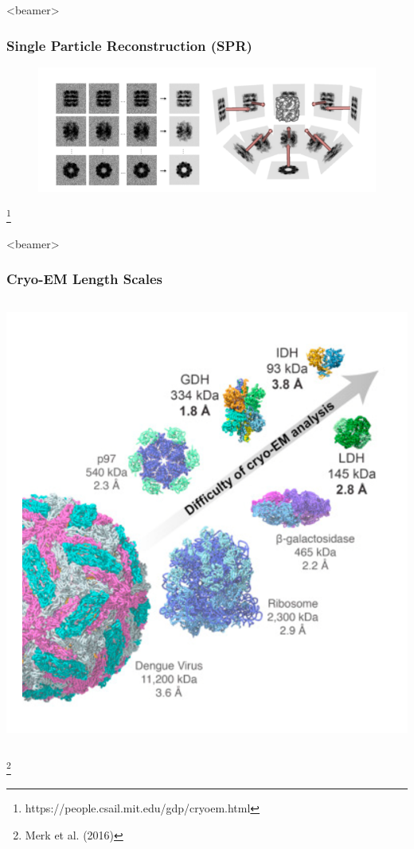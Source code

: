 \documentclass{beamer}
\newcommand\blfootnote[1]{%
  \begingroup
  \renewcommand\thefootnote{}\footnote{#1}%
  \addtocounter{footnote}{-1}%
  \endgroup
}
\begin{document}
\begin{frame}<beamer>
\frametitle{Single Particle Reconstruction (SPR)}
\begin{figure}[h]
\centering
{%
\includegraphics[scale=0.65]{figures/backproj.png}}
\label{fig:rawims}
\end{figure} 
\blfootnote{https://people.csail.mit.edu/gdp/cryoem.html}
\end{frame}


\begin{frame}<beamer>
\frametitle{Cryo-EM Length Scales}
\begin{columns}
\centering
\includegraphics[scale=0.4]{figures/news_scales.png}
\end{columns}
\blfootnote{Merk et al. (2016)}
\end{frame}
\end{document}
